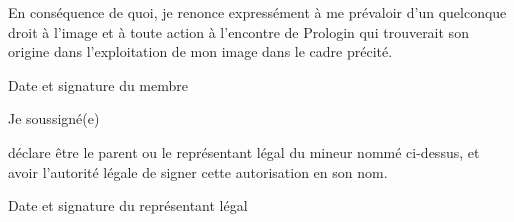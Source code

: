 \documentclass[a4paper,12pt]{prologin}
\begin{document}
En conséquence de quoi, je renonce expressément à me prévaloir d'un
quelconque droit à l'image et à toute action à l'encontre de Prologin qui
trouverait son origine dans l'exploitation de mon image dans le cadre précité.

\begin{signatureframe}{Date et signature du membre}\end{signatureframe}

\begin{legalrepframe}[title=À remplir par le représentant légal si le membre est mineur]
    Je soussigné(e) \hrulefill

    déclare être le parent ou le représentant légal du mineur nommé
    ci-dessus, et avoir l'autorité légale de signer cette autorisation en son nom.

    \begin{signatureframe}{Date et signature du représentant légal}\end{signatureframe}
\end{legalrepframe}
\end{document}
